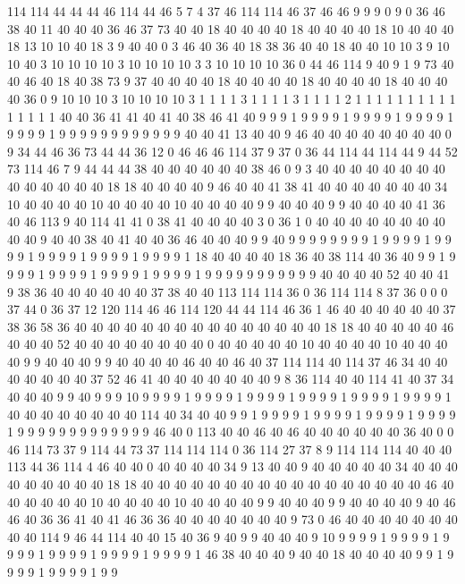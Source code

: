 114 114 44 44 44 46 114 44 46 5 7 4 37 46 114 114 46 37 46 46
9 9 9 0 9 0 36 46 38 40 11 40 40 40 36 46 37 73 40 40
18 40 40 40 40 18 40 40 40 40 18 10 40 40 40 18 13 10 10 40
18 3 9 40 40 0 3 46 40 36 40 18 38 36 40 40 18 40 40 10
10 3 9 10 10 40 3 10 10 10 10 3 10 10 10 10 3 3 10 10
10 10 36 0 44 46 114 9 40 9 1 9 73 40 40 46 40 18 40 38
73 9 37 40 40 40 40 18 40 40 40 40 18 40 40 40 40 18 40 40
40 40 36 0 9 10 10 10 3 10 10 10 10 3 1 1 1 1 3 1
1 1 1 3 1 1 1 1 2 1 1 1 1 1 1 1 1 1 1 1
1 1 1 1 40 40 36 41 41 40 41 40 38 46 41 40 9 9 9 1
9 9 9 9 1 9 9 9 9 1 9 9 9 9 1 9 9 9 9 1
9 9 9 9 9 9 9 9 9 9 9 9 40 40 41 13 40 40 9 46
40 40 40 40 40 40 40 40 0 9 34 44 46 36 73 44 44 36 12 0
46 46 46 114 37 9 37 0 36 44 114 44 114 44 9 44 52 73 114 46
7 9 44 44 44 38 40 40 40 40 40 40 38 46 0 9 3 40 40 40
40 40 40 40 40 40 40 40 40 40 40 18 18 40 40 40 40 9 46 40
40 41 38 41 40 40 40 40 40 40 40 34 10 40 40 40 40 10 40 40
40 40 10 40 40 40 40 9 9 40 40 40 9 9 40 40 40 40 41 36
40 46 113 9 40 114 41 41 0 38 41 40 40 40 40 3 0 36 1 0
40 40 40 40 40 40 40 40 40 40 9 40 40 38 40 41 40 40 36 46
40 40 40 9 9 40 9 9 9 9 9 9 9 9 1 9 9 9 9 1
9 9 9 9 1 9 9 9 9 1 9 9 9 9 1 9 9 9 9 1
18 40 40 40 40 18 36 40 38 114 40 36 40 9 9 1 9 9 9 9
1 9 9 9 9 1 9 9 9 9 1 9 9 9 9 1 9 9 9 9
9 9 9 9 9 9 9 40 40 40 40 52 40 40 41 9 38 36 40 40
40 40 40 40 37 38 40 40 113 114 114 36 0 36 114 114 8 37 36 0
0 0 37 44 0 36 37 12 120 114 46 46 114 120 44 44 114 46 36 1
46 40 40 40 40 40 40 37 38 36 58 36 40 40 40 40 40 40 40 40
40 40 40 40 40 40 40 18 18 40 40 40 40 40 46 40 40 40 52 40
40 40 40 40 40 40 40 0 40 40 40 40 40 10 40 40 40 40 10 40
40 40 40 9 9 40 40 40 9 9 40 40 40 40 46 40 40 46 40 37
114 114 40 114 37 46 34 40 40 40 40 40 40 40 37 52 46 41 40 40
40 40 40 40 40 9 8 36 114 40 40 114 41 40 37 34 40 40 40 9
9 40 9 9 9 10 9 9 9 9 1 9 9 9 9 1 9 9 9 9
1 9 9 9 9 1 9 9 9 9 1 9 9 9 9 1 40 40 40 40
40 40 40 40 114 40 34 40 40 9 9 1 9 9 9 9 1 9 9 9
9 1 9 9 9 9 1 9 9 9 9 1 9 9 9 9 9 9 9 9
9 9 9 9 9 46 40 0 113 40 40 46 40 46 40 40 40 40 40 40
36 40 0 0 46 114 73 37 9 114 44 73 37 114 114 114 0 36 114 27
37 8 9 114 114 114 40 40 40 113 44 36 114 4 46 40 40 0 40 40
40 40 34 9 13 40 40 9 40 40 40 40 40 34 40 40 40 40 40 40
40 40 40 18 18 40 40 40 40 40 40 40 40 40 40 40 40 40 40 40
40 40 46 40 40 40 40 40 40 10 40 40 40 40 10 40 40 40 40 9
9 40 40 40 9 9 40 40 40 40 9 40 46 46 40 36 36 41 40 41
46 36 36 40 40 40 40 40 40 40 9 73 0 46 40 40 40 40 40 40
40 40 40 114 9 46 44 114 40 40 15 40 36 9 40 9 9 40 40 40
9 10 9 9 9 9 1 9 9 9 9 1 9 9 9 9 1 9 9 9
9 1 9 9 9 9 1 9 9 9 9 1 46 38 40 40 40 9 40 40
18 40 40 40 40 9 9 1 9 9 9 9 1 9 9 9 9 1 9 9
